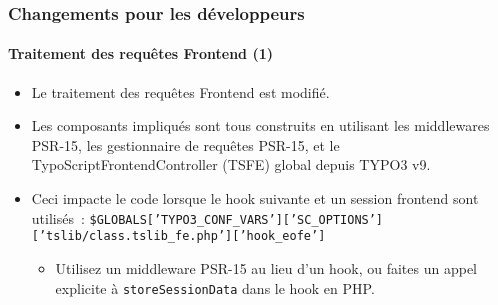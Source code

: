 
\begin{frame}[fragile]
	\frametitle{Changements pour les développeurs}
	\framesubtitle{Traitement des requêtes Frontend (1)}

	\lstset{basicstyle=\smaller\ttfamily}

	\begin{itemize}
		\item Le traitement des requêtes Frontend est modifié.

		\item Les composants impliqués sont tous construits en utilisant les middlewares PSR-15,
			les gestionnaire de requêtes PSR-15, et le TypoScriptFrontendController (TSFE) global
			depuis TYPO3 v9.

		\item Ceci impacte le code lorsque le hook suivante et un session frontend sont utilisés~:\newline
			{\fontsize{7}{8}\selectfont\texttt{\$GLOBALS['TYPO3\_CONF\_VARS']['SC\_OPTIONS']['tslib/class.tslib\_fe.php']['hook\_eofe']}}

			\begin{itemize}\smaller
				\item[\ding{228}] Utilisez un middleware PSR-15 au lieu d'un hook,
					ou faites un appel explicite à \texttt{storeSessionData}
					dans le hook en PHP.
			\end{itemize}\normalsize

	\end{itemize}

\end{frame}


